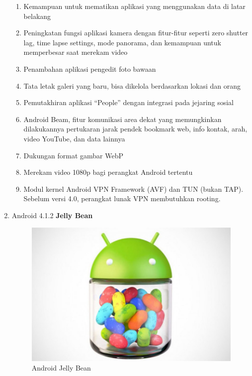 \begin{enumerate}
\begin{enumerate}
    \item Kemampuan untuk mematikan aplikasi yang menggunakan data di latar belakang
    \item Peningkatan fungsi aplikasi kamera dengan fitur-fitur seperti zero shutter lag, time lapse settings, mode panorama, dan kemampuan untuk memperbesar saat merekam video
    \item Penambahan aplikasi pengedit foto bawaan
    \item Tata letak galeri yang baru, bisa dikelola berdasarkan lokasi dan orang
    \item Pemutakhiran aplikasi “People” dengan integrasi pada jejaring sosial
    \item Android Beam, fitur komunikasi area dekat yang memungkinkan dilakukannya pertukaran jarak pendek bookmark web, info kontak, arah, video YouTube, dan data lainnya
    \item Dukungan format gambar WebP
    \item Merekam video 1080p bagi perangkat Android tertentu
    \item Modul kernel Android VPN Framework (AVF) dan TUN (bukan TAP). Sebelum versi 4.0, perangkat lunak VPN membutuhkan rooting.
\end{enumerate}

\item Android 4.1.2 \textbf{Jelly Bean}
\begin{figure}[!htbp]
    \centering
    \includegraphics[scale=0.25]{pictures/android-jelly-bean.jpg}
    \caption{Android Jelly Bean}
    \label{}
\end{figure}


\end{enumerate}
